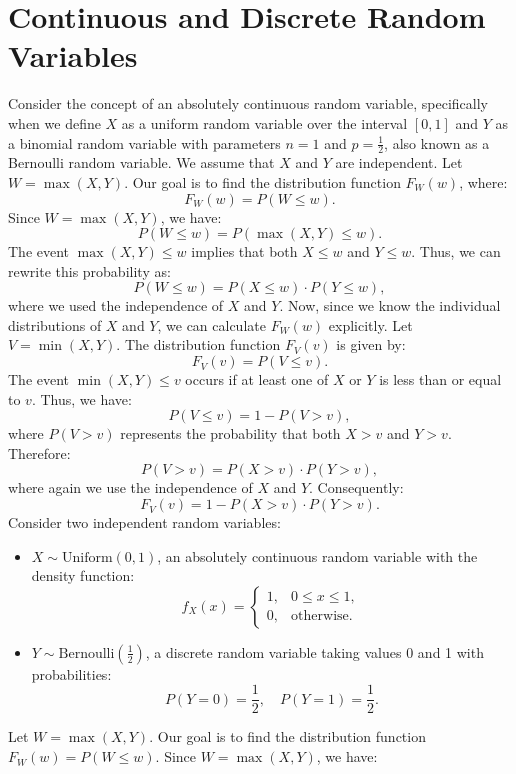 \section{Continuous and Discrete Random Variables}
Consider the concept of an absolutely continuous random variable, specifically when we define \( X \) as a uniform random variable over the interval \( [0, 1] \) and \( Y \) as a binomial random variable with parameters \( n = 1 \) and \( p = \frac{1}{2} \), also known as a Bernoulli random variable. We assume that \( X \) and \( Y \) are independent. \newline
Let \( W = \max(X, Y) \). Our goal is to find the distribution function \( F_W(w) \), where:
\[
F_W(w) = P(W \leq w).
\]
Since \( W = \max(X, Y) \), we have:
\[
P(W \leq w) = P(\max(X, Y) \leq w).
\]
The event \( \max(X, Y) \leq w \) implies that both \( X \leq w \) and \( Y \leq w \). Thus, we can rewrite this probability as:
\[
P(W \leq w) = P(X \leq w) \cdot P(Y \leq w),
\]
where we used the independence of \( X \) and \( Y \). Now, since we know the individual distributions of \( X \) and \( Y \), we can calculate \( F_W(w) \) explicitly. \newline
Let \( V = \min(X, Y) \). The distribution function \( F_V(v) \) is given by:
\[
F_V(v) = P(V \leq v).
\]
The event \( \min(X, Y) \leq v \) occurs if at least one of \( X \) or \( Y \) is less than or equal to \( v \). Thus, we have:
\[
P(V \leq v) = 1 - P(V > v),
\]
where \( P(V > v) \) represents the probability that both \( X > v \) and \( Y > v \). Therefore:
\[
P(V > v) = P(X > v) \cdot P(Y > v),
\]
where again we use the independence of \( X \) and \( Y \). Consequently:
\[
F_V(v) = 1 - P(X > v) \cdot P(Y > v).
\]
Consider two independent random variables:
\begin{itemize}
    \item \( X \sim \text{Uniform}(0, 1) \), an absolutely continuous random variable with the density function:
  \[
  f_X(x) = 
  \begin{cases} 
  1, & 0 \leq x \leq 1, \\ 
  0, & \text{otherwise}.
  \end{cases}
  \]
  \item \( Y \sim \text{Bernoulli}\left(\frac{1}{2}\right) \), a discrete random variable taking values 0 and 1 with probabilities:
  \[
  P(Y = 0) = \frac{1}{2}, \quad P(Y = 1) = \frac{1}{2}.
  \]
\end{itemize} 
Let \( W = \max(X, Y) \). Our goal is to find the distribution function \( F_W(w) = P(W \leq w) \). Since \( W = \max(X, Y) \), we have:
